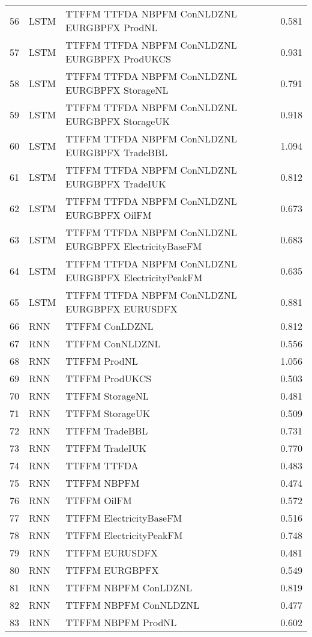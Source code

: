\begin{table}[ht]
\begin{tabular}{rllr}
  56 & LSTM & TTFFM TTFDA NBPFM ConNLDZNL EURGBPFX ProdNL & 0.581 \\ 
  57 & LSTM & TTFFM TTFDA NBPFM ConNLDZNL EURGBPFX ProdUKCS & 0.931 \\ 
  58 & LSTM & TTFFM TTFDA NBPFM ConNLDZNL EURGBPFX StorageNL & 0.791 \\ 
  59 & LSTM & TTFFM TTFDA NBPFM ConNLDZNL EURGBPFX StorageUK & 0.918 \\ 
  60 & LSTM & TTFFM TTFDA NBPFM ConNLDZNL EURGBPFX TradeBBL & 1.094 \\ 
  61 & LSTM & TTFFM TTFDA NBPFM ConNLDZNL EURGBPFX TradeIUK & 0.812 \\ 
  62 & LSTM & TTFFM TTFDA NBPFM ConNLDZNL EURGBPFX OilFM & 0.673 \\ 
  63 & LSTM & TTFFM TTFDA NBPFM ConNLDZNL EURGBPFX ElectricityBaseFM & 0.683 \\ 
  64 & LSTM & TTFFM TTFDA NBPFM ConNLDZNL EURGBPFX ElectricityPeakFM & 0.635 \\ 
  65 & LSTM & TTFFM TTFDA NBPFM ConNLDZNL EURGBPFX EURUSDFX & 0.881 \\ 
  66 & RNN & TTFFM ConLDZNL & 0.812 \\ 
  67 & RNN & TTFFM ConNLDZNL & 0.556 \\ 
  68 & RNN & TTFFM ProdNL & 1.056 \\ 
  69 & RNN & TTFFM ProdUKCS & 0.503 \\ 
  70 & RNN & TTFFM StorageNL & 0.481 \\ 
  71 & RNN & TTFFM StorageUK & 0.509 \\ 
  72 & RNN & TTFFM TradeBBL & 0.731 \\ 
  73 & RNN & TTFFM TradeIUK & 0.770 \\ 
  74 & RNN & TTFFM TTFDA & 0.483 \\ 
  75 & RNN & TTFFM NBPFM & 0.474 \\ 
  76 & RNN & TTFFM OilFM & 0.572 \\ 
  77 & RNN & TTFFM ElectricityBaseFM & 0.516 \\ 
  78 & RNN & TTFFM ElectricityPeakFM & 0.748 \\ 
  79 & RNN & TTFFM EURUSDFX & 0.481 \\ 
  80 & RNN & TTFFM EURGBPFX & 0.549 \\ 
  81 & RNN & TTFFM NBPFM ConLDZNL & 0.819 \\ 
  82 & RNN & TTFFM NBPFM ConNLDZNL & 0.477 \\ 
  83 & RNN & TTFFM NBPFM ProdNL & 0.602 \\ 

\end{tabular}
\end{table}
